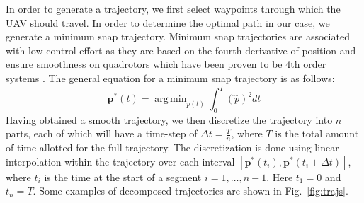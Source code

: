 \documentclass[letterpaper, 10 pt, conference]{ieeeconf}  %
\newcommand\NB[1]{$\spadesuit$\footnote{NB: #1}}
\DeclareMathOperator*{\argmin}{arg\,min}
\begin{document}
In order to generate a trajectory, we first select waypoints through which the UAV should travel. In order to determine the optimal path in our case, we generate a minimum snap trajectory. Minimum snap trajectories are associated with low control effort as they are based on the fourth derivative of position and ensure smoothness on quadrotors which have been proven to be 4th order systems \cite{minsnap}. The general equation for a minimum snap trajectory is as follows:
\begin{equation} \label{eq:minjerkint}
    \bm{p}^*(t) = \argmin_{p(t)}\int_0^T(\ddddot{p})^2dt
\end{equation}
Having obtained a smooth trajectory, we then discretize the trajectory into $n$ parts, each of which will have a time-step of $\Delta t = \frac{T}{n}$, where $T$ is the total amount of time allotted for the full trajectory. The discretization is done using linear interpolation within the trajectory over each interval $[\bm{p}^*(t_i), \bm{p}^*(t_i+\Delta t)]$, where $t_i$ is the time at the start of a segment $i=1, \ldots, n-1$. Here $t_1=0$ and $t_n=T$.
Some examples of decomposed trajectories are shown in Fig.~\ref{fig:trajs}. 
\end{document}

